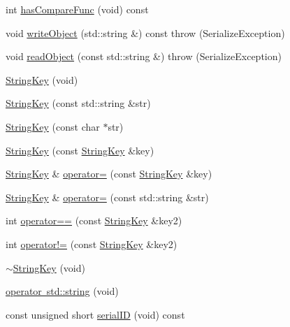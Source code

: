 \begin{DoxyCompactItemize}
\item 
int \mbox{\hyperlink{classFILEDB_1_1StringKey_a430c4d6d22db7160c501c1703f9f13cf}{has\+Compare\+Func}} (void) const
\item 
void \mbox{\hyperlink{classFILEDB_1_1StringKey_a29db7eea425c851c5e0a4336d7a85fb1}{write\+Object}} (std\+::string \&) const  throw (\+Serialize\+Exception)
\item 
void \mbox{\hyperlink{classFILEDB_1_1StringKey_a25cefb184c88bc5bf871245e82ea21f9}{read\+Object}} (const std\+::string \&)  throw (\+Serialize\+Exception)
\item 
\mbox{\hyperlink{classFILEDB_1_1StringKey_ada360436c743f4464e82b0cb2757d229}{String\+Key}} (void)
\item 
\mbox{\hyperlink{classFILEDB_1_1StringKey_a18edda7351ebadd52d18bcde2cc8a71c}{String\+Key}} (const std\+::string \&str)
\item 
\mbox{\hyperlink{classFILEDB_1_1StringKey_a7710b1f6cafd04e1e178d24019e81ae5}{String\+Key}} (const char $\ast$str)
\item 
\mbox{\hyperlink{classFILEDB_1_1StringKey_a042b0231e08bfbd9f9bc3802d95d0e9c}{String\+Key}} (const \mbox{\hyperlink{classFILEDB_1_1StringKey}{String\+Key}} \&key)
\item 
\mbox{\hyperlink{classFILEDB_1_1StringKey}{String\+Key}} \& \mbox{\hyperlink{classFILEDB_1_1StringKey_ab4a0ca971c84abd8b85f6d423163a00f}{operator=}} (const \mbox{\hyperlink{classFILEDB_1_1StringKey}{String\+Key}} \&key)
\item 
\mbox{\hyperlink{classFILEDB_1_1StringKey}{String\+Key}} \& \mbox{\hyperlink{classFILEDB_1_1StringKey_ad52c218455b3eb934a68f3d13ab6512e}{operator=}} (const std\+::string \&str)
\item 
int \mbox{\hyperlink{classFILEDB_1_1StringKey_a75f2abcdf7d61bb860156f8758a56a1f}{operator==}} (const \mbox{\hyperlink{classFILEDB_1_1StringKey}{String\+Key}} \&key2)
\item 
int \mbox{\hyperlink{classFILEDB_1_1StringKey_ad7c210e36fa7438742afa4ed3c66a3df}{operator!=}} (const \mbox{\hyperlink{classFILEDB_1_1StringKey}{String\+Key}} \&key2)
\item 
\mbox{\hyperlink{classFILEDB_1_1StringKey_a45b2488c42cb895e30b927366ae96785}{$\sim$\+String\+Key}} (void)
\item 
\mbox{\hyperlink{classFILEDB_1_1StringKey_a4ce28a2e70cc35cbf7dd8f7a9424fbb0}{operator std\+::string}} (void)
\item 
const unsigned short \mbox{\hyperlink{classFILEDB_1_1StringKey_ad139b5cab667be479edae524f436805a}{serial\+ID}} (void) const

\end{DoxyCompactItemize}

